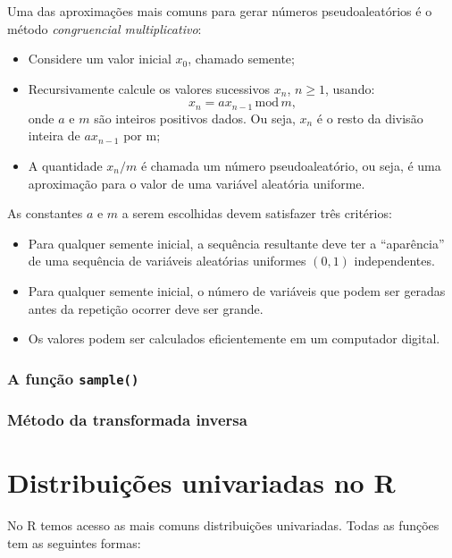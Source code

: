 \documentclass[
]{book}
\theoremstyle{definition}
\theoremstyle{definition}
\theoremstyle{definition}
\theoremstyle{definition}
\theoremstyle{remark}
\begin{document}
Uma das aproximações mais comuns para gerar números pseudoaleatórios é o método \emph{congruencial multiplicativo}:

\begin{itemize}
\item
  Considere um valor inicial \(x_0\), chamado semente;
\item
  Recursivamente calcule os valores sucessivos \(x_{n}\), \(n\geq 1\), usando: \[x_{n} = ax_{n-1} \, \text{mod}\, m,\] onde \(a\) e \(m\) são inteiros positivos dados. Ou seja, \(x_{n}\) é o resto da divisão inteira de \(ax_{n-1}\) por m;
\item
  A quantidade \(x_{n}/m\) é chamada um número pseudoaleatório, ou seja, é uma aproximação para o valor de uma variável aleatória uniforme.
\end{itemize}

As constantes \(a\) e \(m\) a serem escolhidas devem satisfazer três critérios:

\begin{itemize}
\item
  Para qualquer semente inicial, a sequência resultante deve ter a ``aparência'' de uma sequência de variáveis aleatórias uniformes \((0,1)\) independentes.
\item
  Para qualquer semente inicial, o número de variáveis que podem ser geradas antes da repetição ocorrer deve ser grande.
\item
  Os valores podem ser calculados eficientemente em um computador digital.
\end{itemize}

\subsection{\texorpdfstring{A função \texttt{sample()}}{A função sample()}}\label{a-funuxe7uxe3o-sample}

\subsection{Método da transformada inversa}\label{muxe9todo-da-transformada-inversa}

\chapter{Distribuições univariadas no R}\label{distribuiuxe7uxf5es-univariadas-no-r}

No R temos acesso as mais comuns distribuições univariadas. Todas as funções tem as seguintes formas:
\end{document}
